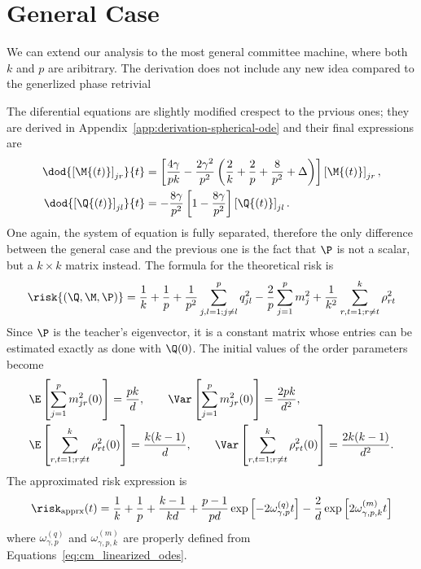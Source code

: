 \section{General Case}
We can extend our analysis to the most general committee machine, where both \(k\) and \(p\) are aribitrary.
The derivation does not include any new idea compared to the generlized phase retrivial

The diferential equations are slightly modified crespect to the prvious ones;
they are derived in Appendix~\ref{app:derivation-spherical-ode} and their final expressions are
\begin{subequations}\label{eq:cm_linearized_odes}\begin{align}
  \dod{\left[\M{\left(t\right)}\right]_{jr}}{t}
    &= \left[
      \frac{4 \gamma}{pk} -\frac{2 \gamma^2}{p^2} \left(\frac2k +\frac{2}{p} + \frac{8}{p^2} + \Delta \right)
    \right] \left[\M{\left(t\right)}\right]_{jr},\\
  \dod{\left[\Q{\left(t\right)}\right]_{jl}}{t} &= -\frac{8 \gamma}{p^2} \left[1-\frac{8\gamma}{p^2}\right] \left[\Q{\left(t\right)}\right]_{jl}.
\end{align}\end{subequations}
One again, the system of equation is fully separated, therefore the only difference between the general case and the previous one is 
the fact that \(\P\) is not a scalar, but a \(k\times k\) matrix instead. The formula for the theoretical risk is
\[
  \risk{(\Q,\M,\P)} = \frac1k + \frac1p + \frac{1}{p^2}\sum_{j,l=1;j\neq l}^p q^2_{jl} - \frac2p \sum_{j=1}^p m^2_{j} + \frac{1}{k^2}\sum_{r,t=1;r\neq t}^k \rho^2_{rt}
\]
Since \(\P\) is the teacher's eigenvector, it is a constant matrix whose entries can be estimated exactly as done with \(\Q(0)\). The initial values of the order parameters become
\[\begin{split}
  &\E\left[\sum_{j=1}^p m_{jr}^2{(0)}\right] = \frac{pk}{d}, \qquad
   \Var\left[\sum_{j=1}^p m_{jr}^2{(0)}\right] = \frac{2pk}{d^2}, \\
  &\E\left[\sum_{r,t=1;r\neq t}^k \rho_{rt}^2{(0)}\right] = \frac{k(k-1)}{d}, \qquad
   \Var\left[\sum_{r,t=1;r\neq t}^k \rho_{rt}^2{(0)}\right] = \frac{2k(k-1)}{d^2}. \\
 \end{split}\]
The approximated risk expression is 
\[
  \risk_\text{apprx}{(t)} = \frac1k + \frac1p + \frac{k-1}{kd} + \frac{p-1}{pd}\exp{\left[-2\omega^{(q)}_{\gamma,p} t\right]} - \frac2d \exp{\left[2\omega^{(m)}_{\gamma,p,k} t\right]}
\]
where \(\omega^{(q)}_{\gamma,p}\) and \(\omega^{(m)}_{\gamma,p,k}\) are properly defined from Equations~\eqref{eq:cm_linearized_odes}.

